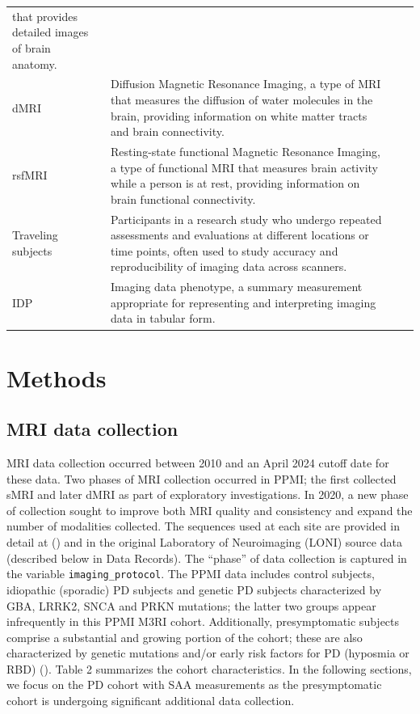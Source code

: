 \documentclass[
  table]{article}
\begin{document}
\begin{table}
\begin{tabular}[t]{lp{10cm}lp{10cm}}
 that provides detailed images of brain
 anatomy.\\
dMRI & Diffusion Magnetic Resonance Imaging, a
 type of MRI that measures the diffusion
 of water molecules in the brain,
 providing information on white matter
 tracts and brain connectivity.\\
rsfMRI & Resting-state functional Magnetic
 Resonance Imaging, a type of functional
 MRI that measures brain activity while
 a person is at rest, providing
 information on brain functional
 connectivity.\\
\addlinespace
Traveling subjects & Participants in a research study who
 undergo repeated assessments and
 evaluations at different locations or
 time points, often used to study
 accuracy and reproducibility of imaging
 data across scanners.\\
IDP & Imaging data phenotype, a summary
 measurement appropriate for
 representing and interpreting imaging
 data in tabular form.\\
\bottomrule
\end{tabular}
\end{table}

\section{Methods}\label{methods}

\subsection{MRI data collection}\label{mri-data-collection}

MRI data collection occurred between 2010 and an April 2024 cutoff date
for these data. Two phases of MRI collection occurred in PPMI; the first
collected sMRI and later dMRI as part of exploratory investigations. In
2020, a new phase of collection sought to improve both MRI quality and
consistency and expand the number of modalities collected. The sequences
used at each site are provided in detail at
() and in the original
Laboratory of Neuroimaging (LONI) source data (described below in Data
Records). The ``phase'' of data collection is captured in the variable
\texttt{imaging\_protocol}. The PPMI data includes control subjects,
idiopathic (sporadic) PD subjects and genetic PD subjects characterized
by GBA, LRRK2, SNCA and PRKN mutations; the latter two groups appear
infrequently in this PPMI M3RI cohort. Additionally, presymptomatic
subjects comprise a substantial and growing portion of the cohort; these
are also characterized by genetic mutations and/or early risk factors
for PD (hyposmia or RBD)
(). Table 2
summarizes the cohort characteristics. In the following sections, we
focus on the PD cohort with SAA measurements as the presymptomatic
cohort is undergoing significant additional data collection.
\end{document}

